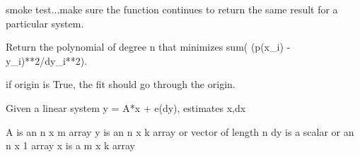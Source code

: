 \documentclass[letterpaper,10pt,english]{sphinxmanual}
\begin{document}

\begin{fulllineitems}
\label{api/wsolve:refl1d.wsolve.demo}
\end{fulllineitems}


\begin{fulllineitems}
\label{api/wsolve:refl1d.wsolve.test}
smoke test...make sure the function continues to return the same
result for a particular system.

\end{fulllineitems}


\begin{fulllineitems}
\label{api/wsolve:refl1d.wsolve.wpolyfit}
Return the polynomial of degree n that
minimizes sum( (p(x\_i) - y\_i)**2/dy\_i**2).

if origin is True, the fit should go through the origin.

\end{fulllineitems}


\begin{fulllineitems}
\label{api/wsolve:refl1d.wsolve.wsolve}
Given a linear system y = A*x + e(dy), estimates x,dx

A is an n x m array
y is an n x k array or vector of length n
dy is a scalar or an n x 1 array
x is a m x k array

\end{fulllineitems}
\end{document}
